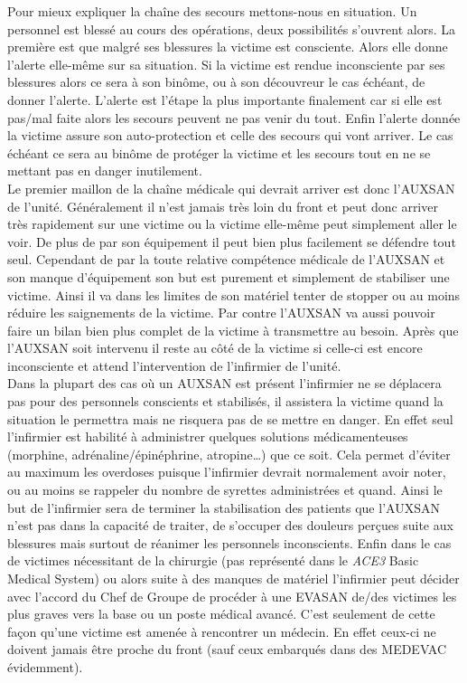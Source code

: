 \documentclass{article}
\newcommand{\medsys}{\emph{ACE3} Basic Medical System}
\begin{document}
		Pour mieux expliquer la chaîne des secours mettons-nous en situation. Un personnel est blessé au cours des opérations, deux possibilités s'ouvrent alors. La première est que malgré ses blessures la victime est consciente. Alors elle donne l'alerte elle-même sur sa situation. Si la victime est rendue inconsciente par ses blessures alors ce sera à son binôme, ou à son découvreur le cas échéant, de donner l'alerte. L'alerte est l'étape la plus importante finalement car si elle est pas/mal faite alors les secours peuvent ne pas venir du tout. Enfin l'alerte donnée la victime assure son auto-protection et celle des secours qui vont arriver. Le cas échéant ce sera au binôme de protéger la victime et les secours tout en ne se mettant pas en danger inutilement.\\
		
		Le premier maillon de la chaîne médicale qui devrait arriver est donc l'AUXSAN de l'unité. Généralement il n'est jamais très loin du front et peut donc arriver très rapidement sur une victime ou la victime elle-même peut simplement aller le voir. De plus de par son équipement il peut bien plus facilement se défendre tout seul. Cependant de par la toute relative compétence médicale de l'AUXSAN et son manque d'équipement son but est purement et simplement de stabiliser une victime. Ainsi il va dans les limites de son matériel tenter de stopper ou au moins réduire les saignements de la victime. Par contre l'AUXSAN va aussi pouvoir faire un bilan bien plus complet de la victime à transmettre au besoin. Après que l'AUXSAN soit intervenu il reste au côté de la victime si celle-ci est encore inconsciente et attend l'intervention de l'infirmier de l'unité. \\
		
		Dans la plupart des cas où un AUXSAN est présent l'infirmier ne se déplacera pas pour des personnels conscients et stabilisés, il assistera la victime quand la situation le permettra mais ne risquera pas de se mettre en danger. En effet seul l'infirmier est habilité à administrer quelques solutions médicamenteuses (morphine, adrénaline/épinéphrine, atropine\dots) que ce soit. Cela permet d'éviter au maximum les overdoses puisque l'infirmier devrait normalement avoir noter, ou au moins se rappeler du nombre de syrettes administrées et quand. Ainsi le but de l'infirmier sera de terminer la stabilisation des patients que l'AUXSAN n'est pas dans la capacité de traiter, de s'occuper des douleurs perçues suite aux blessures mais surtout de réanimer les personnels inconscients. Enfin dans le cas de victimes nécessitant de la chirurgie (pas représenté dans le \medsys) ou alors suite à des manques de matériel l'infirmier peut décider avec l'accord du Chef de Groupe de procéder à une EVASAN de/des victimes les plus graves vers la base ou un poste médical avancé. C'est seulement de cette façon qu'une victime est amenée à rencontrer un médecin. En effet ceux-ci ne doivent jamais être proche du front (sauf ceux embarqués dans des MEDEVAC évidemment).\\
		
\end{document}
